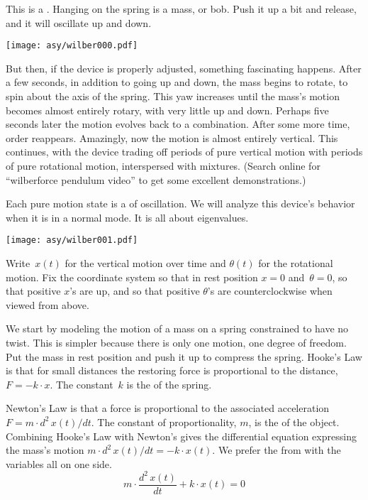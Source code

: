 
% 

This is a .
Hanging on the spring is a mass, or bob.
Push it up a bit and release, and it will oscillate up and down.
\begin{center}
  \texttt{[image: asy/wilber000.pdf]}
\end{center}
But then, if the device is properly adjusted, something fascinating happens.
After a few seconds, in addition to going up
and down, the mass begins to rotate,
to spin about the axis of the spring.
This yaw increases until the mass's motion  
becomes almost entirely rotary, with very little up and down.
Perhaps five seconds later the motion evolves back to a combination.
After some more time, order reappears.
Amazingly, now
the motion is almost entirely vertical.
This continues, with the device trading off
periods of pure vertical motion with periods of pure rotational motion,
interspersed with mixtures. 
(Search online for ``wilberforce pendulum video'' to get 
some excellent demonstrations.) 

Each pure motion state is a  of oscillation.
We will analyze this device's behavior when it is in a normal mode. 
It is all about eigenvalues.

\begin{center}
  \texttt{[image: asy/wilber001.pdf]}
\end{center}

Write~$x(t)$ for the vertical motion over time and 
$\theta(t)$ for the rotational motion.
Fix the coordinate system so that in rest position $x=0$ and~$\theta=0$, 
so that positive $x$'s are up, and so that positive $\theta$'s
are counterclockwise when viewed from above.

We start by modeling the motion of a mass on a 
spring constrained to have no twist.
This is simpler because there is only one motion, one degree of freedom.
Put the mass in rest position and 
push it up to compress the spring.
Hooke's Law is that for small distances
the restoring force is 
proportional to the distance, $F=-k\cdot x$.
The constant~$k$ is the
 of the spring.

Newton's Law is that a force is proportional to the 
associated acceleration $F=m\cdot d^2\,x(t)/dt$.
The constant of proportionality, $m$, is the 
of the object.
Combining Hooke's Law with Newton's 
gives the differential equation expressing the 
mass's motion $m\cdot d^2\,x(t)/dt=-k\cdot x(t)$.
We prefer the from with the variables all on one side.
\begin{equation*}
  m\cdot \frac{d^2\,x(t)}{dt}+k\cdot x(t)=0
  \tag{$*$}
\end{equation*}

